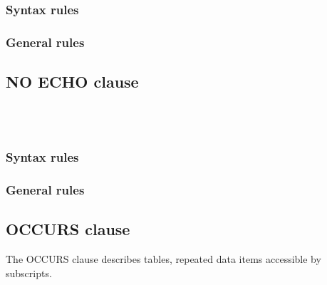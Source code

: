\subsubsection{Syntax rules}

\subsubsection{General rules}

\subsection{NO ECHO clause}

\begin{syntax}[\miscextcolour]
  \begin{1=}
      \\
     \\
  \end{1=}
\end{syntax}

\subsubsection{Syntax rules}

\subsubsection{General rules}

\subsection{OCCURS clause}

The OCCURS clause describes tables, repeated data items accessible by subscripts.

